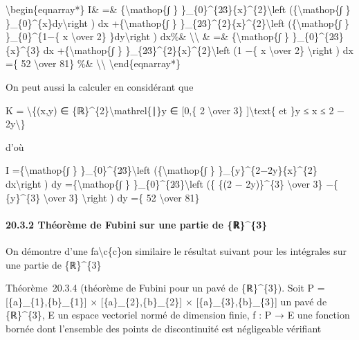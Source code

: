\documentclass[]{article}
\begin{document}
\textbackslash{}begin\{eqnarray*\} I\& =\& \{\textbackslash{}mathop\{∫
\} \}\_\{0\}\^{}\{2∕3\}\{x\}\^{}\{2\}\textbackslash{}left
(\{\textbackslash{}mathop\{∫ \}
\}\_\{0\}\^{}\{x\}dy\textbackslash{}right ) dx
+\{\textbackslash{}mathop\{∫ \}
\}\_\{2∕3\}\^{}\{2\}\{x\}\^{}\{2\}\textbackslash{}left
(\{\textbackslash{}mathop\{∫ \} \}\_\{0\}\^{}\{1−\{ x
\textbackslash{}over 2\} \}dy\textbackslash{}right ) dx\%\&
\textbackslash{}\textbackslash{} \& =\& \{\textbackslash{}mathop\{∫ \}
\}\_\{0\}\^{}\{2∕3\}\{x\}\^{}\{3\} dx +\{\textbackslash{}mathop\{∫ \}
\}\_\{2∕3\}\^{}\{2\}\{x\}\^{}\{2\}\textbackslash{}left (1 −\{ x
\textbackslash{}over 2\} \textbackslash{}right ) dx =\{ 52
\textbackslash{}over 81\} \%\& \textbackslash{}\textbackslash{}
\textbackslash{}end\{eqnarray*\}

On peut aussi la calculer en considérant que

K = \textbackslash{}\{(x,y) ∈
\{ℝ\}\^{}\{2\}\textbackslash{}mathrel\{∣\}y ∈ {[}0,\{ 2
\textbackslash{}over 3\} {]}\textbackslash{}text\{ et \}y ≤ x ≤ 2 −
2y\textbackslash{}\}

d'où

I =\{\textbackslash{}mathop\{∫ \}
\}\_\{0\}\^{}\{2∕3\}\textbackslash{}left (\{\textbackslash{}mathop\{∫ \}
\}\_\{y\}\^{}\{2−2y\}\{x\}\^{}\{2\} dx\textbackslash{}right ) dy
=\{\textbackslash{}mathop\{∫ \} \}\_\{0\}\^{}\{2∕3\}\textbackslash{}left
(\{ \{(2 − 2y)\}\^{}\{3\} \textbackslash{}over 3\} −\{ \{y\}\^{}\{3\}
\textbackslash{}over 3\} \textbackslash{}right ) dy =\{ 52
\textbackslash{}over 81\}

\paragraph{20.3.2 Théorème de Fubini sur une partie de \{ℝ\}\^{}\{3\}}

On démontre d'une fa\textbackslash{}c\{c\}on similaire le résultat
suivant pour les intégrales sur une partie de \{ℝ\}\^{}\{3\}

Théorème~20.3.4 (théorème de Fubini pour un pavé de \{ℝ\}\^{}\{3\}).
Soit P = {[}\{a\}\_\{1\},\{b\}\_\{1\}{]} ×
{[}\{a\}\_\{2\},\{b\}\_\{2\}{]} × {[}\{a\}\_\{3\},\{b\}\_\{3\}{]} un
pavé de \{ℝ\}\^{}\{3\}, E un espace vectoriel normé de dimension finie,
f : P → E une fonction bornée dont l'ensemble des points de
discontinuité est négligeable vérifiant
\end{document}
